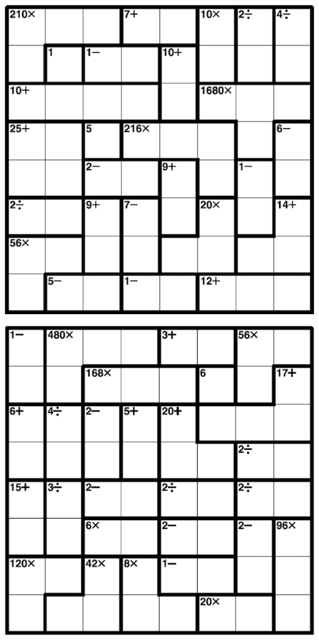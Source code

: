 
\includegraphics[scale=1]{Gambar/Lampiran/8x8_5.png}

\includegraphics[scale=1]{Gambar/Lampiran/8x8_6.png}
